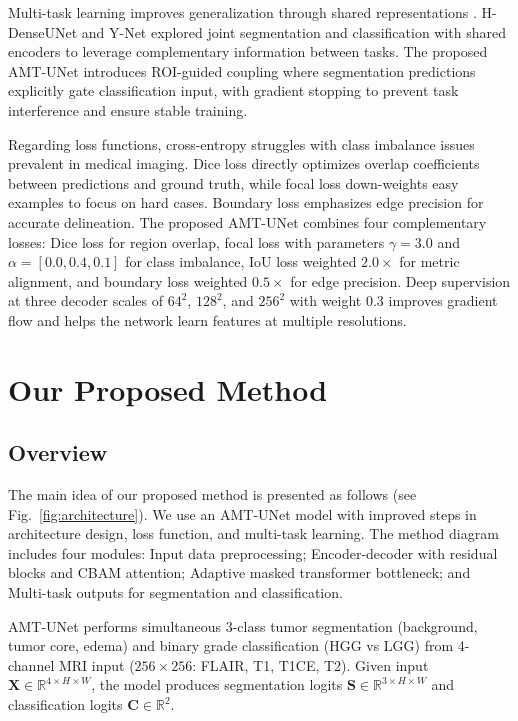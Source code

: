 \documentclass[runningheads]{llncs}
\begin{document}
Multi-task learning improves generalization through shared representations \cite{caruana1997multitask}. H-DenseUNet \cite{li2018hdenseunet} and Y-Net \cite{mehta2018ynet} explored joint segmentation and classification with shared encoders to leverage complementary information between tasks. The proposed AMT-UNet introduces ROI-guided coupling where segmentation predictions explicitly gate classification input, with gradient stopping to prevent task interference and ensure stable training.

Regarding loss functions, cross-entropy struggles with class imbalance issues prevalent in medical imaging. Dice loss \cite{milletari2016vnet} directly optimizes overlap coefficients between predictions and ground truth, while focal loss \cite{lin2017focal} down-weights easy examples to focus on hard cases. Boundary loss \cite{kervadec2019boundary} emphasizes edge precision for accurate delineation. The proposed AMT-UNet combines four complementary losses: Dice loss for region overlap, focal loss with parameters $\gamma=3.0$ and $\alpha=[0.0, 0.4, 0.1]$ for class imbalance, IoU loss weighted $2.0\times$ for metric alignment, and boundary loss weighted $0.5\times$ for edge precision. Deep supervision at three decoder scales of $64^2$, $128^2$, and $256^2$ with weight 0.3 improves gradient flow \cite{lee2015deeply} and helps the network learn features at multiple resolutions.
%
%
\section{Our Proposed Method}

\subsection{Overview}

The main idea of our proposed method is presented as follows (see Fig.~\ref{fig:architecture}). We use an AMT-UNet model with improved steps in architecture design, loss function, and multi-task learning. The method diagram includes four modules: Input data preprocessing; Encoder-decoder with residual blocks and CBAM attention; Adaptive masked transformer bottleneck; and Multi-task outputs for segmentation and classification.

AMT-UNet performs simultaneous 3-class tumor segmentation (background, tumor core, edema) and binary grade classification (HGG vs LGG) from 4-channel MRI input ($256 \times 256$: FLAIR, T1, T1CE, T2). Given input $\mathbf{X} \in \mathbb{R}^{4 \times H \times W}$, the model produces segmentation logits $\mathbf{S} \in \mathbb{R}^{3 \times H \times W}$ and classification logits $\mathbf{C} \in \mathbb{R}^{2}$.
\end{document}

